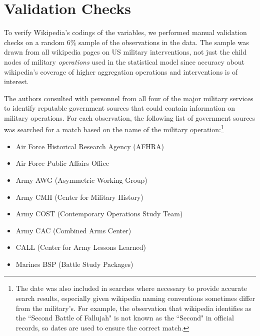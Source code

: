 \documentclass[fleqn,12pt]{article}
\begin{document}
\section{Validation Checks}

To verify Wikipedia's codings of the variables, we performed manual validation checks on a random 6\% sample of the observations in the data. The sample was drawn from all wikipedia pages on US military interventions, not just the child nodes of military \textit{operations} used in the statistical model since accuracy about wikipedia's coverage of higher aggregation operations and interventions is of interest.

The authors consulted with personnel from all four of the major military services to identify reputable government sources that could contain information on military operations. For each observation, the following list of government sources was searched for a match based on the name of the military operation:\footnote{The date was also included in searches where necessary to provide accurate search results, especially given wikipedia naming conventions sometimes differ from the military's. For example, the observation that wikipedia identifies as the ``Second Battle of Fallujah" is not known as the ``Second" in official records, so dates are used to ensure the correct match.}

\begin{itemize}
    \item Air Force Historical Research Agency (AFHRA)
    \item Air Force Public Affairs Office
    \item Army AWG (Asymmetric Working Group)
    \item Army CMH (Center for Military History)
    \item Army COST (Contemporary Operations Study Team)
    \item Army CAC (Combined Arms Center)
    \item CALL (Center for Army Lessons Learned)
    \item Marines BSP (Battle Study Packages)
\end{itemize}
\end{document}
